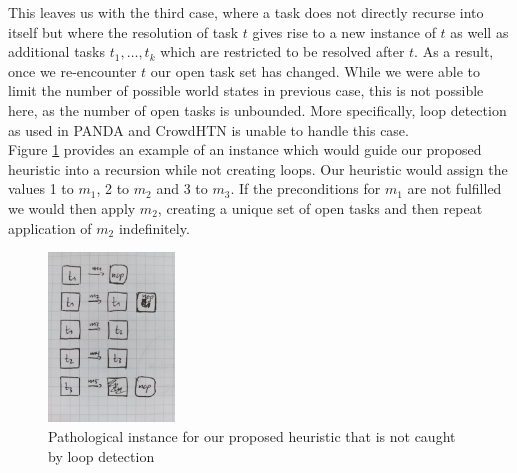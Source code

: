 This leaves us with the third case, where a task does not directly recurse into itself but where the resolution of task $t$ gives rise to a new instance of $t$ as well as additional tasks $t_1, \ldots, t_k$ which are restricted to be resolved after $t$. As a result, once we re-encounter $t$ our open task set has changed. While we were able to limit the number of possible world states in previous case, this is not possible here, as the number of open tasks is unbounded. More specifically, loop detection as used in PANDA and CrowdHTN is unable to handle this case. \\
Figure \ref{figure: pathological heuristic loop} provides an example of an instance which would guide our proposed heuristic into a recursion while not creating loops. Our heuristic would assign the values 1 to $m_1$, 2 to $m_2$ and 3 to $m_3$. If the preconditions for $m_1$ are not fulfilled we would then apply $m_2$, creating a unique set of open tasks and then repeat application of $m_2$ indefinitely.
\begin{figure}
	\caption{Pathological instance for our proposed heuristic that is not caught by loop detection}
	\label{figure: pathological heuristic loop}
	\centering
	\includegraphics[width=0.3\textwidth]{images/prelim/loop_detection_pathological}
\end{figure}

